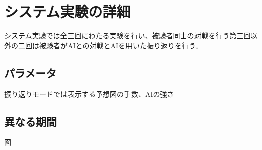\chapter{システム実験の詳細}
システム実験では全三回にわたる実験を行い、被験者同士の対戦を行う第三回以外の二回は被験者がAIとの対戦とAIを用いた振り返りを行う。
\section{パラメータ}
振り返りモードでは表示する予想図の手数、AIの強さ
\section{異なる期間}

図